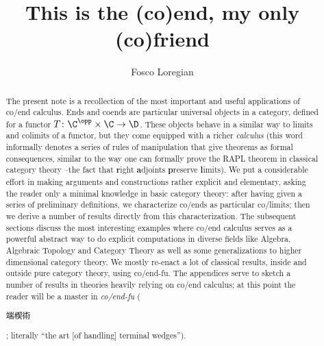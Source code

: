 \title[Ends]{This is the (co)end, my only (co)friend}
 
\author{Fosco Loregian}
\address{%
Department of Mathematics and Statistics             \newline
Masaryk University, Faculty of Sciences              \newline
Kotl\'{a}\v{r}sk\'{a} 2, 611 37 Brno, Czech Republic \newline
\href{mailto:loregianf@math.muni.cz}
   {\sf loregianf@math.muni.cz}
\href{mailto:loregianf@math.muni.cz}
   {\sf fosco.loregian@gmail.com}}

\begin{abstract}The present note is a recollection of the most important and useful applications of co/end calculus. Ends and coends are particular universal objects in a category, defined for a functor $T\colon \C^\opp\times \C \to \D$. These objects behave in a similar way to limits and colimits of a functor, but they come equipped with a richer \emph{calculus} (this word informally denotes a series of rules of manipulation that give theorems as formal consequences, similar to the way one can formally prove the RAPL theorem in classical category theory --the fact that \textbf{r}ight \textbf{a}djoints \textbf{p}reserve \textbf{l}imits). We put a considerable effort in making arguments and constructions rather explicit and elementary, asking the reader only a minimal knowledge in basic category theory: after having given a series of preliminary definitions, we characterize co/ends as particular co/limits; then we derive a number of results directly from this characterization. The subsequent sections discuss the most interesting examples where co/end calculus serves as a powerful abstract way to do explicit computations in diverse fields like Algebra, Algebraic Topology and Category Theory as well as some generalizations to higher dimensional category theory. We mostly re\hyp{}enact a lot of classical results, inside and outside pure category theory, using co/end-fu. The appendices serve to sketch a number of results in theories heavily relying on co/end calculus; at this point the reader will be a master in \emph{co/end-fu} (\begin{CJK*}{UTF8}{bsmi}端楔術\end{CJK*}; literally ``the art [of handling] terminal wedges'').
\end{abstract}

\subjclass[2010]{}

